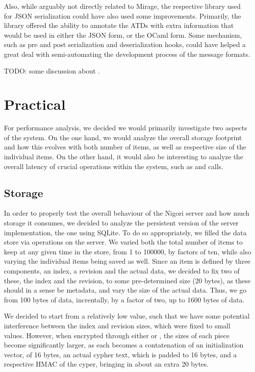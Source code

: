 Also, while arguably not directly related to Mirage, the respective library used for JSON serialization could have also used some improvements.
Primarily, the library offered the ability to annotate the ATDs with extra information that would be used in either the JSON form, or the OCaml form.
Some mechanism, such as pre and post serialization and deserialization hooks, could have helped a great deal with semi-automating the development process of the message formats.

TODO: some discussion about .

\section{Practical}
For performance analysis, we decided we would primarily investigate two aspects of the system.
On the one hand, we would analyze the overall storage footprint and how this evolves with both number of items, as well as respective size of the individual items.
On the other hand, it would also be interesting to analyze the overall latency of crucial operations within the system, such as  and  calls.

\subsection{Storage}
In order to properly test the overall behaviour of the Nigori server and how much storage it consumes, we decided to analyze the persistent version of the server implementation, the one using SQLite.
To do so appropriately, we filled the data store via  operations on the server.
We varied both the total number of items to keep at any given time in the store, from 1 to 100000, by factors of ten, while also varying the individual items being saved as well.
Since an item is defined by three components, an index, a revision and the actual data, we decided to fix two of these, the index and the revision, to some pre-determined size (20 bytes), as these should in a sense be metadata, and vary the size of the actual data.
Thus, we go from 100 bytes of data, increntally, by a factor of two, up to 1600 bytes of data.

We decided to start from a relatively low value, such that we have some potential interference between the index and revision sizes, which were fixed to small values.
However, when encrypted through either  or , the sizes of each piece become significantly larger, as each becomes a contatenation of an  initialization vector, of 16 bytes, an actual  cypher text, which is padded to 16 bytes, and a respective HMAC of the cyper, bringing in about an extra 20 bytes.

